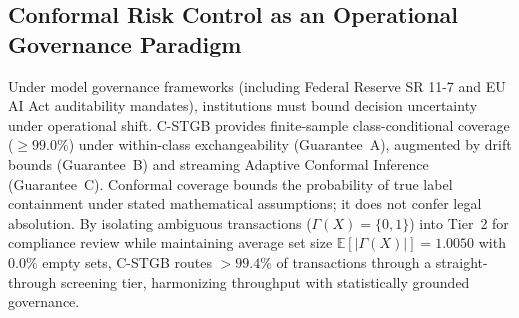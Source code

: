 \subsection{Conformal Risk Control as an Operational Governance Paradigm}
\label{sec:discussion_conformal_governance}
Under model governance frameworks (including Federal Reserve SR 11-7 \citep{fed2011sr117} and EU AI Act auditability mandates), institutions must bound decision uncertainty under operational shift. C-STGB provides finite-sample class-conditional coverage ($\ge 99.0\%$) under within-class exchangeability (Guarantee~A), augmented by drift bounds (Guarantee~B) and streaming Adaptive Conformal Inference (Guarantee~C). Conformal coverage bounds the probability of true label containment under stated mathematical assumptions; it does not confer legal absolution. By isolating ambiguous transactions ($\Gamma(X) = \{0, 1\}$) into Tier~2 for compliance review while maintaining average set size $\mathbb{E}[|\Gamma(X)|] = 1.0050$ with $0.0\%$ empty sets, C-STGB routes $>99.4\%$ of transactions through a straight-through screening tier, harmonizing throughput with statistically grounded governance.
